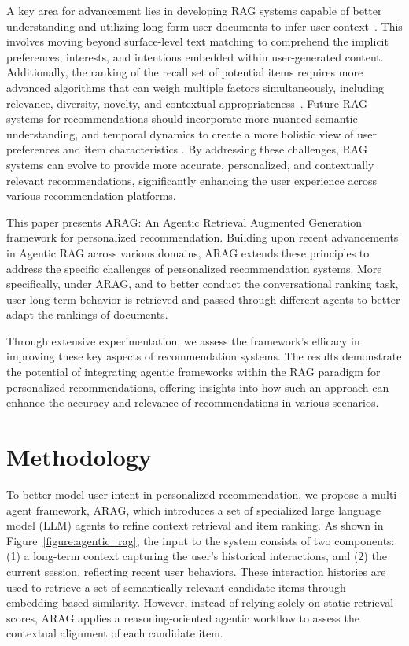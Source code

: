 \documentclass[sigconf]{acmart}
\begin{document}
A key area for advancement lies in developing RAG systems capable of better understanding and utilizing long-form user documents to infer user context~\cite{cui2024context, gunathilaka2025addressing, rakkappan2019context}. This involves moving beyond surface-level text matching to comprehend the implicit preferences, interests, and intentions embedded within user-generated content. Additionally, the ranking of the recall set of potential items requires more advanced algorithms that can weigh multiple factors simultaneously, including relevance, diversity, novelty, and contextual appropriateness~\cite{yu2024rankrag, ke2024bridging, maragheh2022prospect, ye2023seller, yousefi2020choice}. Future RAG systems for recommendations should incorporate more nuanced semantic understanding, and temporal dynamics to create a more holistic view of user preferences and item characteristics \cite{hong2023metagpt, chen2024magicore}. By addressing these challenges, RAG systems can evolve to provide more accurate, personalized, and contextually relevant recommendations, significantly enhancing the user experience across various recommendation platforms.

This paper presents ARAG: An Agentic Retrieval Augmented Generation framework for personalized recommendation. Building upon recent advancements in Agentic RAG across various domains, ARAG extends these principles to address the specific challenges of personalized recommendation systems. More specifically, under ARAG, and to better conduct the conversational ranking task, user long-term behavior is retrieved and passed through different agents to better adapt the rankings of documents.  

Through extensive experimentation, we assess the framework's efficacy in improving these key aspects of recommendation systems. The results demonstrate the potential of integrating agentic frameworks within the RAG paradigm for personalized recommendations, offering insights into how such an approach can enhance the accuracy and relevance of recommendations in various scenarios. 

\section{Methodology}

To better model user intent in personalized recommendation, we propose a multi-agent framework, ARAG, which introduces a set of specialized large language model (LLM) agents to refine context retrieval and item ranking. As shown in Figure~\ref{figure:agentic_rag}, the input to the system consists of two components: (1) a long-term context capturing the user’s historical interactions, and (2) the current session, reflecting recent user behaviors. These interaction histories are used to retrieve a set of semantically relevant candidate items through embedding-based similarity. However, instead of relying solely on static retrieval scores, ARAG applies a reasoning-oriented agentic workflow to assess the contextual alignment of each candidate item.
\end{document}
